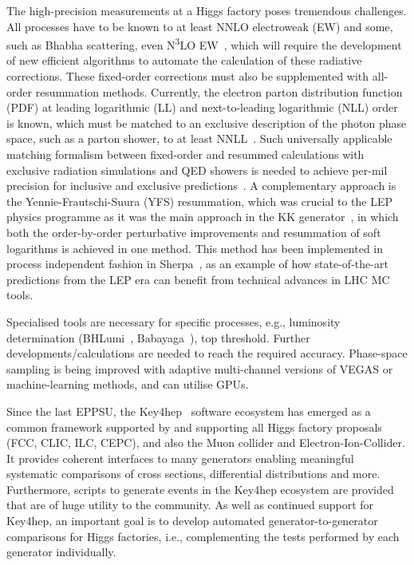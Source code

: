 \documentclass[10pt,a4paper]{article}
\begin{document}
The high-precision measurements at a Higgs factory poses tremendous challenges.
All processes have to be known to at least NNLO electroweak (EW) and
some, such as Bhabha scattering, even N\textsuperscript{3}LO
EW~\cite{ECFAHiggsStudy:2025}, which will require the development of new
efficient algorithms to automate the calculation of these radiative corrections.
These fixed-order corrections must also be supplemented with all-order
resummation methods. Currently, the electron parton distribution function (PDF)
at leading logarithmic (LL) and next-to-leading logarithmic (NLL) order is known, which must be matched to an exclusive description
of the photon phase space, such as a parton shower, to at least
NNLL~\cite{ECFAHiggsStudy:2025,Bertone:2019hks,Frixione:2019lga}. Such
universally applicable matching formalism between fixed-order and resummed
calculations with exclusive radiation simulations and QED showers is needed to
achieve per-mil precision for inclusive and exclusive
predictions~\cite{Frixione:2022ofv}. A complementary approach is the
Yennie-Frautschi-Suura (YFS) resummation, which was crucial to the LEP physics
programme as it was the main approach in the KK generator~\cite{Jadach:1999vf}, in which both
the order-by-order perturbative improvements and resummation of soft logarithms
is achieved in one method. This method has been implemented in process
independent fashion in Sherpa~\cite{Krauss:2022ajk}, as an example of how state-of-the-art predictions from the LEP era can benefit from technical advances in
LHC MC tools.

Specialised tools are necessary for specific processes, e.g., luminosity
determination (BHLumi~\cite{Jadach:1991by}, Babayaga~\cite{CarloniCalame:2003yt}), top threshold. Further
developments/calculations are needed to reach the required accuracy. Phase-space
sampling is being improved with adaptive multi-channel versions of VEGAS or
machine-learning methods, and can utilise GPUs.

Since the last EPPSU, the Key4hep~\cite{Ganis2022, Sailer:2020fah} software ecosystem has
emerged as a common framework supported by and supporting all Higgs factory proposals
(FCC, CLIC, ILC, CEPC), and also the Muon collider and
Electron-Ion-Collider. It provides coherent interfaces to many
generators enabling meaningful systematic comparisons of cross
sections, differential distributions and more. Furthermore, scripts to
generate events in the Key4hep ecosystem are provided that are of huge
utility to the community. As well as continued support for Key4hep, an
important goal is to develop automated generator-to-generator
comparisons for Higgs factories, i.e., complementing the tests performed
by each generator individually.
\end{document}
